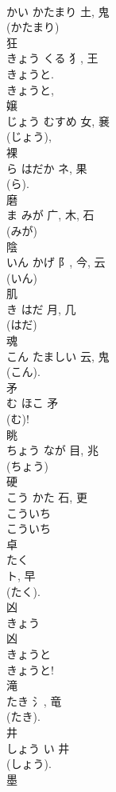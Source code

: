 \documentclass[8pt]{extreport}
\begin{document}
\begin{CJK}{UTF8}{min}
\\	かい	かたまり	土, 鬼	
\\	(かたまり) 
\\	狂	
\\	きょう	くる	犭, 王	
\\	きょうと. 
\\	きょうと, 
\\	嬢	
\\	じょう	むすめ	女, 㐮	
\\	(じょう),
\\	裸	
\\	ら	はだか	ネ, 果	
\\	(ら).	
\\	磨	
\\	ま	みが	广, 木, 石	
\\	(みが) 
\\	陰	
\\	いん	かげ	阝, 今, 云	
\\	(いん) 
\\	肌	
\\	き	はだ	月, 几	
\\	(はだ) 
\\	魂	
\\	こん	たましい	云, 鬼	
\\	(こん). 
\\	矛	
\\	む	ほこ	矛	
\\	(む)!
\\	眺	
\\	ちょう	なが	目, 兆	
\\	(ちょう) 
\\	硬	
\\	こう	かた	石, 更	
\\	こういち 
\\	こういち 
\\	卓	
\\	たく	
\\	ト, 早	
\\	(たく).	
\\	凶	
\\	きょう	
\\	凶	
\\	きょうと 
\\	きょうと! 
\\	滝	
\\	たき	氵, 竜	
\\	(たき).	
\\	井	
\\	しょう	い	井	
\\	(しょう). 
\\	墨	

\end{CJK}
\end{document}

